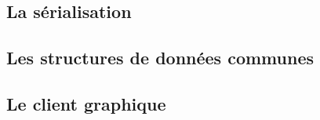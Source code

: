 \documentclass[french]{beamer}
\begin{document}
	\subsection{La sérialisation}

	\subsection{Les structures de données communes}

	\subsection{Le client graphique}




	
\end{document}
